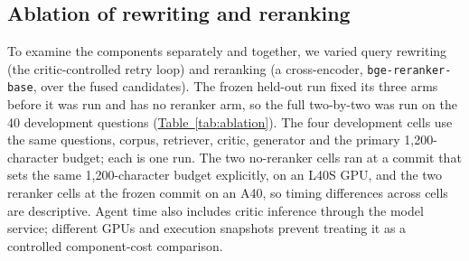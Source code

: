 \subsection{Ablation of rewriting and reranking}
To examine the components separately and together, we varied query rewriting (the critic-controlled retry loop) and reranking (a cross-encoder, \texttt{bge-reranker-base}, over the fused candidates). The frozen held-out run fixed its three arms before it was run and has no reranker arm, so the full two-by-two was run on the 40 development questions (\hyperref[tab:ablation]{Table~\ref*{tab:ablation}}). The four development cells use the same questions, corpus, retriever, critic, generator and the primary 1{,}200-character budget; each is one run. The two no-reranker cells ran at a commit that sets the same 1{,}200-character budget explicitly, on an L40S GPU, and the two reranker cells at the frozen commit on an A40, so timing differences across cells are descriptive. Agent time also includes critic inference through the model service; different GPUs and execution snapshots prevent treating it as a controlled component-cost comparison.
